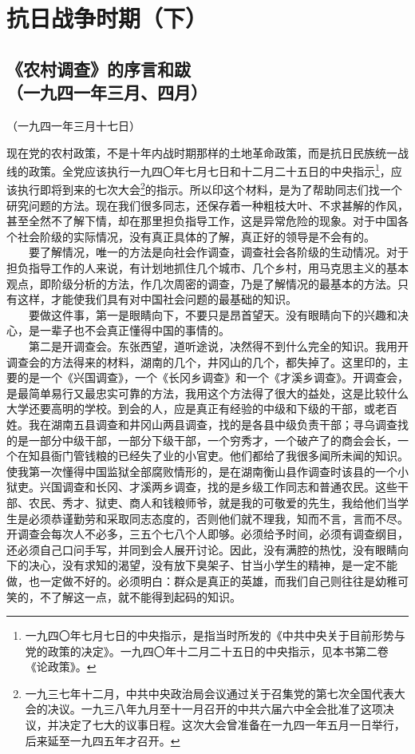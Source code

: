 \documentclass[cn,11pt,chinese]{elegantbook}
\def\myformat#1{\hfil\hfil #1}
\begin{document}
\chapter*{抗日战争时期（下）}\newpage\section*{\myformat{《农村调查》的序言和跋}\\\myformat{（一九四一年三月、四月）}}
\begin{introduction}\item （一九四一年三月十七日）\end{introduction}
现在党的农村政策，不是十年内战时期那样的土地革命政策，而是抗日民族统一战线的政策。全党应该执行一九四〇年七月七日和十二月二十五日的中央指示\footnote[1]{ 一九四〇年七月七日的中央指示，是指当时所发的《中共中央关于目前形势与党的政策的决定》。一九四〇年十二月二十五日的中央指示，见本书第二卷《论政策》。}，应该执行即将到来的七次大会\footnote[2]{ 一九三七年十二月，中共中央政治局会议通过关于召集党的第七次全国代表大会的决议。一九三八年九月至十一月召开的中共六届六中全会批准了这项决议，并决定了七大的议事日程。这次大会曾准备在一九四一年五月一日举行，后来延至一九四五年才召开。}的指示。所以印这个材料，是为了帮助同志们找一个研究问题的方法。现在我们很多同志，还保存着一种粗枝大叶、不求甚解的作风，甚至全然不了解下情，却在那里担负指导工作，这是异常危险的现象。对于中国各个社会阶级的实际情况，没有真正具体的了解，真正好的领导是不会有的。\\
　　要了解情况，唯一的方法是向社会作调查，调查社会各阶级的生动情况。对于担负指导工作的人来说，有计划地抓住几个城市、几个乡村，用马克思主义的基本观点，即阶级分析的方法，作几次周密的调查，乃是了解情况的最基本的方法。只有这样，才能使我们具有对中国社会问题的最基础的知识。\\
　　要做这件事，第一是眼睛向下，不要只是昂首望天。没有眼睛向下的兴趣和决心，是一辈子也不会真正懂得中国的事情的。\\
　　第二是开调查会。东张西望，道听途说，决然得不到什么完全的知识。我用开调查会的方法得来的材料，湖南的几个，井冈山的几个，都失掉了。这里印的，主要的是一个《兴国调查》，一个《长冈乡调查》和一个《才溪乡调查》。开调查会，是最简单易行又最忠实可靠的方法，我用这个方法得了很大的益处，这是比较什么大学还要高明的学校。到会的人，应是真正有经验的中级和下级的干部，或老百姓。我在湖南五县调查和井冈山两县调查，找的是各县中级负责干部；寻乌调查找的是一部分中级干部，一部分下级干部，一个穷秀才，一个破产了的商会会长，一个在知县衙门管钱粮的已经失了业的小官吏。他们都给了我很多闻所未闻的知识。使我第一次懂得中国监狱全部腐败情形的，是在湖南衡山县作调查时该县的一个小狱吏。兴国调查和长冈、才溪两乡调查，找的是乡级工作同志和普通农民。这些干部、农民、秀才、狱吏、商人和钱粮师爷，就是我的可敬爱的先生，我给他们当学生是必须恭谨勤劳和采取同志态度的，否则他们就不理我，知而不言，言而不尽。开调查会每次人不必多，三五个七八个人即够。必须给予时间，必须有调查纲目，还必须自己口问手写，并同到会人展开讨论。因此，没有满腔的热忱，没有眼睛向下的决心，没有求知的渴望，没有放下臭架子、甘当小学生的精神，是一定不能做，也一定做不好的。必须明白：群众是真正的英雄，而我们自己则往往是幼稚可笑的，不了解这一点，就不能得到起码的知识。\\
\end{document}
